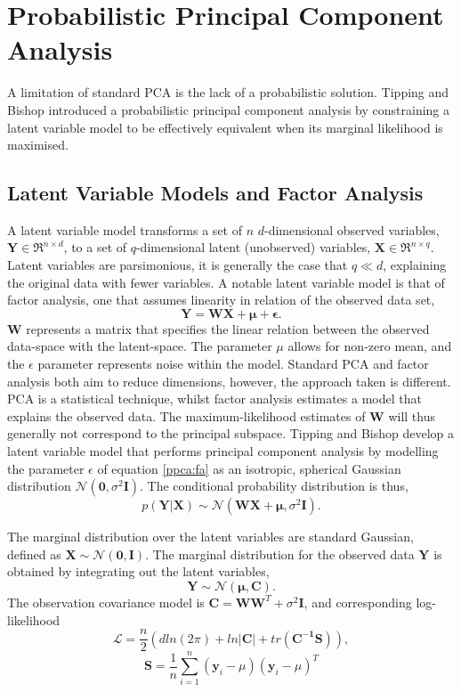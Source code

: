 \documentclass[ %
                    author={Dillon Keith Diep [INCOMPLETE DRAFT, NOT FOR SUBMISSION]},
                supervisor={Dr. Carl Henrik Ek},
                    degree={MEng},
                     title={ARt-CG:},
                  subtitle={Assisted Real-time Content Generation of 3D Hair by Learning Manifolds},
                      type={Research},
                      year={2014} ]{dissertation}
\begin{document}
\section{Probabilistic Principal Component Analysis}
A limitation of standard PCA is the lack of a probabilistic solution. Tipping and Bishop introduced a probabilistic principal component analysis by constraining a latent variable model to be effectively equivalent when its marginal likelihood is maximised. \cite{ppca}

\subsection{Latent Variable Models and Factor Analysis}
A latent variable model transforms a set of $n$ $d$-dimensional observed variables, $\mathbf{Y}\in\Re^{n \times d}$, to a set of $q$-dimensional latent (unobserved) variables, $\mathbf{X}\in\Re^{n \times q}$. Latent variables are parsimonious, it is generally the case that $q \ll d$, explaining the original data with fewer variables. A notable latent variable model is that of factor analysis, one that assumes linearity in relation of the observed data set,
\begin{equation} \label{ppca:fa}
	\mathbf{Y=WX+\mu+\epsilon}.
\end{equation}
$\mathbf{W}$ represents a matrix that specifies the linear relation between the observed data-space with the latent-space.
The parameter $\mu$ allows for non-zero mean, and the $\epsilon$ parameter represents noise within the model. Standard PCA and factor analysis both aim to reduce dimensions, however, the approach taken is different. PCA is a statistical technique, whilst factor analysis estimates a model that explains the observed data. The maximum-likelihood estimates of $\mathbf{W}$ will thus generally not correspond to the principal subspace. Tipping and Bishop develop a latent variable model that performs principal component analysis by modelling the parameter $\epsilon$ of equation \ref{ppca:fa} as an isotropic, spherical Gaussian distribution $\mathcal{N}(\mathbf{0},\sigma^2\mathbf{I})$. The conditional probability distribution is thus,
\begin{equation} \label{ppca:conditional}
	p(\mathbf{Y|X})\sim\mathcal{N}(\mathbf{WX+\mu},\sigma^2\mathbf{I}). 
\end{equation}

The marginal distribution over the latent variables are standard Gaussian, defined as $\mathbf{X\sim\mathcal{N}(0,I)}$. The marginal distribution for the observed data $\mathbf{Y}$ is obtained by integrating out the latent variables,
$$\mathbf{Y}\sim\mathcal{N}\mathbf{(\mu,C)}.$$
The observation covariance model is $\mathbf{C=WW}^T+\sigma^2\mathbf{I}$, and corresponding log-likelihood
\begin{equation} \label{ppca:loglikelihood}
	\mathcal{L}=\frac{n}{2}(d ln(2\pi)+ln|\mathbf{C}|+tr(\mathbf{C^{-1}S})),
\end{equation}
$$\mathbf{S}=\frac{1}{n}\sum^n_{i=1}(\mathbf{y}_i-\mu)(\mathbf{y}_i-\mu)^T$$
\end{document}
